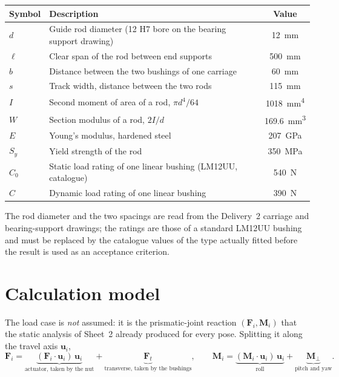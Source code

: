 \documentclass[11pt]{article}
\begin{document}
\begin{center}
\begin{tabular}{@{}llc@{}}
\toprule
\textbf{Symbol} & \textbf{Description} & \textbf{Value} \\
\midrule
$d$   & Guide rod diameter (12 H7 bore on the bearing support drawing) & \SI{12}{\milli\metre} \\
$\ell$& Clear span of the rod between end supports                     & \SI{500}{\milli\metre} \\
$b$   & Distance between the two bushings of one carriage              & \SI{60}{\milli\metre} \\
$s$   & Track width, distance between the two rods                     & \SI{115}{\milli\metre} \\
$I$   & Second moment of area of a rod, $\pi d^4/64$                   & \SI{1018}{\milli\metre\tothe{4}} \\
$W$   & Section modulus of a rod, $2I/d$                               & \SI{169.6}{\milli\metre\cubed} \\
$E$   & Young's modulus, hardened steel                                & \SI{207}{\giga\pascal} \\
$S_y$ & Yield strength of the rod                                      & \SI{350}{\mega\pascal} \\
$C_0$ & Static load rating of one linear bushing (LM12UU, catalogue)   & \SI{540}{\newton} \\
$C$   & Dynamic load rating of one linear bushing                      & \SI{390}{\newton} \\
\bottomrule
\end{tabular}
\end{center}

The rod diameter and the two spacings are read from the Delivery~2 carriage and
bearing-support drawings; the ratings are those of a standard LM12UU bushing and must be
replaced by the catalogue values of the type actually fitted before the result is used as
an acceptance criterion.

\section{Calculation model}\label{sec:gui-model}

The load case is \emph{not} assumed: it is the prismatic-joint reaction
$(\bm F_i,\bm M_i)$ that the static analysis of Sheet~2 already produced for every pose.
Splitting it along the travel axis $\bm u_i$,
\begin{equation}
\bm F_i = \underbrace{(\bm F_i\!\cdot\!\bm u_i)\,\bm u_i}_{\text{actuator, taken by the nut}}
        + \underbrace{\bm F_{t}}_{\text{transverse, taken by the bushings}},
\qquad
\bm M_i = \underbrace{(\bm M_i\!\cdot\!\bm u_i)\,\bm u_i}_{\text{roll}}
        + \underbrace{\bm M_{\perp}}_{\text{pitch and yaw}} .
\end{equation}
\end{document}
